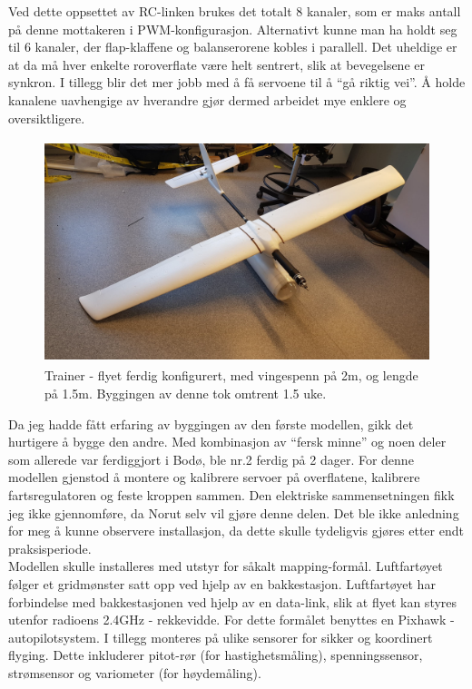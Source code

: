 \documentclass[12pt, a4paper]{article}
\begin{document}
Ved dette oppsettet av RC-linken brukes det totalt 8 kanaler, som er maks antall på denne mottakeren i PWM-konfigurasjon. Alternativt kunne man ha holdt seg til 6 kanaler, der flap-klaffene og balanserorene kobles i parallell. Det uheldige er at da må hver enkelte roroverflate være helt sentrert, slik at bevegelsene er synkron. I tillegg blir det mer jobb med å få servoene til å ``gå riktig vei''. Å holde kanalene uavhengige av hverandre gjør dermed arbeidet mye enklere og oversiktligere. 

\begin{figure}[ht]
	\centering
	\includegraphics[width=.6\textwidth, height = 6.5cm]{bilder/forste_fly_ferdigstilt.jpg}
	\caption[Trainer-fly]{Trainer - flyet ferdig konfigurert, med vingespenn på 2m, og lengde på 1.5m. Byggingen av denne tok omtrent 1.5 uke. }
\end{figure}

Da jeg hadde fått erfaring av byggingen av den første modellen, gikk det hurtigere å bygge den andre. Med kombinasjon av ``fersk minne'' og noen deler som allerede var ferdiggjort i Bodø, ble nr.2 ferdig på 2 dager. For denne modellen gjenstod å montere og kalibrere servoer på overflatene, kalibrere fartsregulatoren og feste kroppen sammen. Den elektriske sammensetningen fikk jeg ikke gjennomføre, da Norut selv vil gjøre denne delen. Det ble ikke anledning for meg å kunne observere installasjon, da dette skulle tydeligvis gjøres etter endt praksisperiode. \\
Modellen skulle installeres med utstyr for såkalt mapping-formål. Luftfartøyet følger et gridmønster satt opp ved hjelp av en bakkestasjon. Luftfartøyet har forbindelse med bakkestasjonen ved hjelp av en data-link, slik at flyet kan styres utenfor radioens 2.4GHz - rekkevidde. For dette formålet benyttes en Pixhawk - autopilotsystem. I tillegg monteres på ulike sensorer for sikker og koordinert flyging. Dette inkluderer pitot-rør (for hastighetsmåling), spenningssensor, strømsensor og variometer (for høydemåling). 
\end{document}
